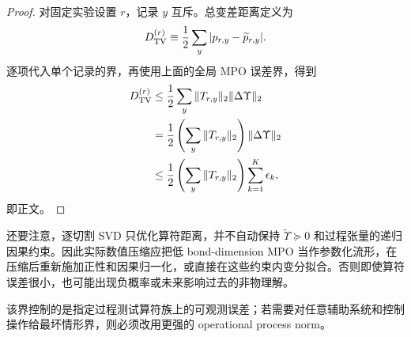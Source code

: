 \begin{proof}
对固定实验设置 $r$，记录 $y$ 互斥。总变差距离定义为
\[
D_{\rm TV}^{(r)}
\equiv
\frac12\sum_y|p_{r,y}-\widetilde p_{r,y}|.
\]
逐项代入单个记录的界，再使用上面的全局 MPO 误差界，得到
\begin{align*}
D_{\rm TV}^{(r)}
&\le\frac12\sum_y
\|T_{r,y}\|_2\|\Delta\Upsilon\|_2\\
&=\frac12
\left(\sum_y\|T_{r,y}\|_2\right)
\|\Delta\Upsilon\|_2\\
&\le\frac12
\left(\sum_y\|T_{r,y}\|_2\right)
\sum_{k=1}^{K}\epsilon_k,
\end{align*}
即正文。
\end{proof}


还要注意，逐切割 SVD 只优化算符距离，并不自动保持 $\widetilde\Upsilon\succeq0$ 和过程张量的递归因果约束。因此实际数值压缩应把低 bond-dimension MPO 当作参数化流形，在压缩后重新施加正性和因果归一化，或直接在这些约束内变分拟合。否则即使算符误差很小，也可能出现负概率或未来影响过去的非物理解。

该界控制的是指定过程测试算符族上的可观测误差；若需要对任意辅助系统和控制操作给最坏情形界，则必须改用更强的 operational process norm。


